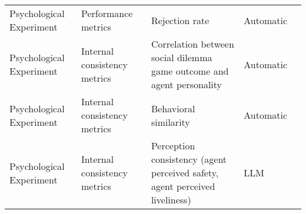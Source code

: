 \begin{small}
\begin{center}
\begin{longtable}{@{}p{}p{}p{}p{}p{}@{}}
Psychological Experiment & Performance metrics                 & Rejection rate                                                                                                                                                                                              & Automatic & \cite{lei2024fairmindsim}                                                                                                                                                                                                                                                                                                                                                                                                   \\
Psychological Experiment & Internal consistency metrics        & Correlation between social dilemma game outcome and agent personality                                                                                                                                       & Automatic & \cite{bose2024assessing}                                                                                                                                                                                                                                                                                                                                                                                      \\
Psychological Experiment & Internal consistency metrics        & Behavioral similarity                                                                                                                                                                                       & Automatic & \cite{Li2024EvolvingAI}                                                                                                                                                                                                                                                                                                                                                                                                    \\
Psychological Experiment & Internal consistency metrics        & Perception consistency (agent perceived safety, agent perceived liveliness)                                                                                                                                 & LLM       & \cite{Verma2023GenerativeAI}                                                                                                                                                                                                                                                                                                                                                                                                    \\

\end{longtable}
\end{center}
\end{small}
